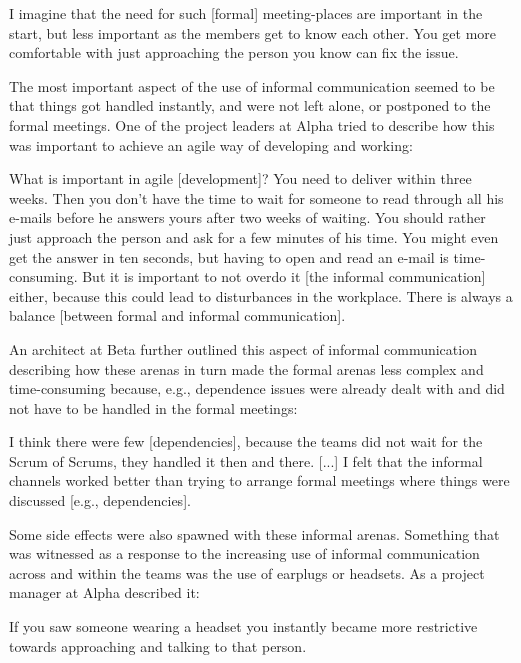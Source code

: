 \begin{fancyquotes}
I imagine that the need for such [formal] meeting-places are important in the start, but less important as the members get to know each other. You get more comfortable with just approaching the person you know can fix the issue.
\end{fancyquotes}

The most important aspect of the use of informal communication seemed to be that things got handled instantly, and were not left alone, or postponed to the formal meetings. One of the project leaders at Alpha tried to describe how this was important to achieve an agile way of developing and working:

\begin{fancyquotes}
What is important in agile [development]? You need to deliver within three weeks. Then you don't have the time to wait for someone to read through all his e-mails before he answers yours after two weeks of waiting. You should rather just approach the person and ask for a few minutes of his time. You might even get the answer in ten seconds, but having to open and read an e-mail is time-consuming. But it is important to not overdo it [the informal communication] either, because this could lead to disturbances in the workplace. There is always a balance [between formal and informal communication].
\end{fancyquotes}

An architect at Beta further outlined this aspect of informal communication describing how these arenas in turn made the formal arenas less complex and time-consuming because, e.g., dependence issues were already dealt with and did not have to be handled in the formal meetings:

\begin{fancyquotes}
I think there were few [dependencies], because the teams did not wait for the Scrum of Scrums, they handled it then and there. [...] I felt that the informal channels worked better than trying to arrange formal meetings where things were discussed [e.g., dependencies].
\end{fancyquotes}

Some side effects were also spawned with these informal arenas. Something that was witnessed as a response to the increasing use of informal communication across and within the teams was the use of earplugs or headsets. As a project manager at Alpha described it:

\begin{fancyquotes}
If you saw someone wearing a headset you instantly became more restrictive towards approaching and talking to that person.
\end{fancyquotes}

